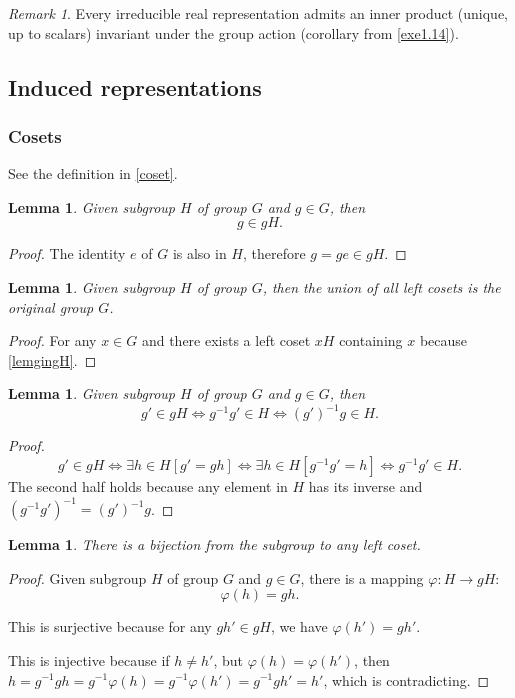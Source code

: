 \documentclass[12pt, letterpaper]{article}
\newtheorem{lem}[prop]{Lemma}
\theoremstyle{definition}
\theoremstyle{remark}
\newtheorem*{rem*}{Remark}
\theoremstyle{definition}
\theoremstyle{plain}
\numberwithin{equation}{section}
\begin{document}
	\begin{rem*}
		Every irreducible real representation
		admits an inner product (unique, up to scalars) invariant under the group 
		action (corollary from \autoref{exe1.14}).
	\end{rem*}

	\subsection{Induced representations}
	\subsubsection{Cosets}
	
	See the definition in \autoref{coset}.
	
	\begin{lem}\label{lemgingH}
		Given subgroup $H$ of group $G$ and $g\in G$,
		then \[ g\in gH. \]
	\end{lem}
	\begin{proof}
		The identity $e$ of $G$ is also in $H$,
		therefore $g=ge\in gH$.
	\end{proof}
	
	\begin{lem}\label{lemCosetsCoverAll}
		Given subgroup $H$ of group $G$,
		then the union of all left cosets is the original group $G$.
	\end{lem}
	\begin{proof}
		For any $x\in G$ and there exists a left coset $xH$ 
		containing $x$ because \autoref{lemgingH}.
	\end{proof}

	\begin{lem}\label{lemCosetToSubGrp}
		Given subgroup $H$ of group $G$ and $g\in G$,
		then \[ g'\in gH\iff g^{-1}g'\in H \iff (g')^{-1}g\in H. \]
	\end{lem}
	\begin{proof}
		\[g'\in gH\iff \exists h\in H[g'=gh] \iff \exists h \in H[g^{-1}g'=h]\iff g^{-1}g'\in H.\]
		The second half holds because any element in $H$ has its inverse
		and $(g^{-1}g')^{-1}=(g')^{-1}g$.
	\end{proof}
	
	\begin{lem}\label{lemSubGrpBijecCoset}
		There is a bijection from the subgroup to any left coset.
	\end{lem}
	\begin{proof}
		Given subgroup $H$ of group $G$ and $g\in G$,
		there is a mapping $\varphi\colon H\to gH$:
		\[\varphi(h)=gh. \]
		
		This is surjective because for any $gh'\in gH$,
		we have $\varphi(h')=gh'$.
		
		This is injective because if $h\ne h'$, but $\varphi(h)=\varphi(h')$,
		then $h=g^{-1}gh=g^{-1}\varphi(h)=g^{-1}\varphi(h')=g^{-1}gh'=h'$, which is contradicting.

	\end{proof}
	
\end{document}
